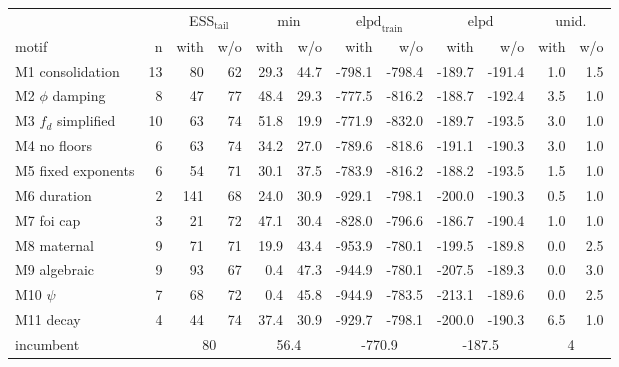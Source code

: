 \documentclass[11pt]{article}
\begin{document}
\begin{table}
\centering
\small
\setlength{\tabcolsep}{2pt}
\begin{tabular}{l r rr rr rr rr rr}
\toprule
& & \multicolumn{2}{c}{ESS$_{\mathrm{tail}}$} & \multicolumn{2}{c}{min} & \multicolumn{2}{c}{$\mathrm{elpd}_{\mathrm{train}}$} & \multicolumn{2}{c}{$\mathrm{elpd}$} & \multicolumn{2}{c}{unid.} \\
\cmidrule(lr){3-4} \cmidrule(lr){5-6} \cmidrule(lr){7-8} \cmidrule(lr){9-10} \cmidrule(lr){11-12}
motif & n & with & w/o & with & w/o & with & w/o & with & w/o & with & w/o \\
\midrule
M1 consolidation & 13 & 80 & 62 & 29.3 & 44.7 & -798.1 & -798.4 & -189.7 & -191.4 & 1.0 & 1.5 \\
M2 $\phi$ damping & 8 & 47 & 77 & 48.4 & 29.3 & -777.5 & -816.2 & -188.7 & -192.4 & 3.5 & 1.0 \\
M3 $f_d$ simplified & 10 & 63 & 74 & 51.8 & 19.9 & -771.9 & -832.0 & -189.7 & -193.5 & 3.0 & 1.0 \\
M4 no floors & 6 & 63 & 74 & 34.2 & 27.0 & -789.6 & -818.6 & -191.1 & -190.3 & 3.0 & 1.0 \\
M5 fixed exponents & 6 & 54 & 71 & 30.1 & 37.5 & -783.9 & -816.2 & -188.2 & -193.5 & 1.5 & 1.0 \\
M6 duration & 2 & 141 & 68 & 24.0 & 30.9 & -929.1 & -798.1 & -200.0 & -190.3 & 0.5 & 1.0 \\
M7 foi cap & 3 & 21 & 72 & 47.1 & 30.4 & -828.0 & -796.6 & -186.7 & -190.4 & 1.0 & 1.0 \\
M8 maternal & 9 & 71 & 71 & 19.9 & 43.4 & -953.9 & -780.1 & -199.5 & -189.8 & 0.0 & 2.5 \\
M9 algebraic & 9 & 93 & 67 & 0.4 & 47.3 & -944.9 & -780.1 & -207.5 & -189.3 & 0.0 & 3.0 \\
M10 $\psi$ & 7 & 68 & 72 & 0.4 & 45.8 & -944.9 & -783.5 & -213.1 & -189.6 & 0.0 & 2.5 \\
M11 decay & 4 & 44 & 74 & 37.4 & 30.9 & -929.7 & -798.1 & -200.0 & -190.3 & 6.5 & 1.0 \\
\midrule
\multicolumn{2}{l}{incumbent} & \multicolumn{2}{c}{80} & \multicolumn{2}{c}{56.4} & \multicolumn{2}{c}{-770.9} & \multicolumn{2}{c}{-187.5} & \multicolumn{2}{c}{4} \\
\bottomrule
\end{tabular}

\end{table}
\end{document}
